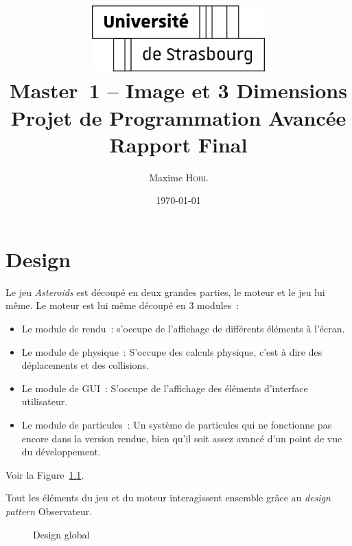 \documentclass[10pt, french, a4paper]{report}
\title{
	\includegraphics[width=0.5\textwidth]{logo-uds.pdf}\\
	\vspace{2em}
	Master~1 -- Image et 3 Dimensions\\
	Projet de Programmation Avancée\\
	Rapport Final
}
\author{Maxime \textsc{Hohl}}
\date{\today}
\begin{document}
\maketitle

\tableofcontents

\chapter{Design}

Le jeu \textit{Asteroids} est découpé en deux grandes parties, le moteur et le jeu lui 
même. Le moteur est lui même découpé en 3 modules~:
\begin{itemize}
	\item Le module de rendu~: s'occupe de l'affichage de différents éléments à l'écran.
	\item Le module de physique~: S'occupe des calculs physique, c'est à dire des
	      déplacements et des collisions.
	\item Le module de GUI~: S'occupe de l'affichage des éléments d'interface utilisateur.
	\item Le module de particules~: Un système de particules qui ne fonctionne pas encore 
	      dans la version rendue, bien qu'il soit assez avancé d'un point de vue du 
	      développement.
\end{itemize}
Voir la Figure~\ref{fig:design-global}.

Tout les éléments du jeu et du moteur interagissent ensemble grâce au \textit{design pattern} Observateur.

\begin{figure}[h]
	\center
	\caption{Design global}
	\label{fig:design-global}
\end{figure}
\end{document}
